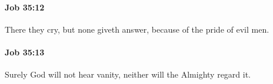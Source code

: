 		\paragraph{Job 35:12} %
			\label{JOB-35-12}

			There they cry, but none giveth answer, because of the pride of evil men.


		\paragraph{Job 35:13} %
			\label{JOB-35-13}

			Surely God will not hear vanity, neither will the Almighty regard it.


